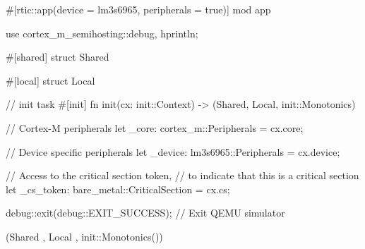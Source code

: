 #[rtic::app(device = lm3s6965, peripherals = true)]
mod app {
    use cortex_m_semihosting::{debug, hprintln};

    #[shared]
    struct Shared {}

    #[local]
    struct Local {}

    // init task 
    #[init]
    fn init(cx: init::Context) -> (Shared, Local, init::Monotonics) {
        // Cortex-M peripherals
        let _core: cortex_m::Peripherals = cx.core;

        // Device specific peripherals
        let _device: lm3s6965::Peripherals = cx.device;

        // Access to the critical section token,
        // to indicate that this is a critical section
        let _cs_token: bare_metal::CriticalSection = cx.cs;

        debug::exit(debug::EXIT_SUCCESS); // Exit QEMU simulator

        (Shared {}, Local {}, init::Monotonics())
    }
}
